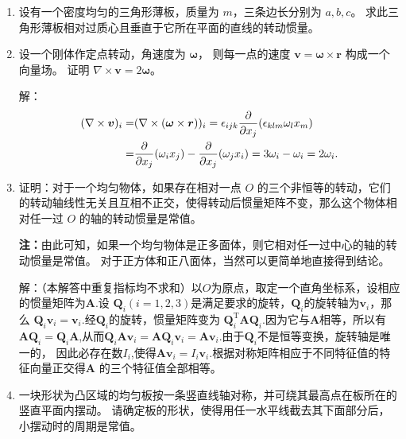 \begin{enumerate}
    \item 设有一个密度均匀的三角形薄板，质量为 $m$，三条边长分别为 $a, b, c$。
    求此三角形薄板相对过质心且垂直于它所在平面的直线的转动惯量。

    \item 设一个刚体作定点转动，角速度为 $\boldsymbol{\omega}$，
    则每一点的速度 $\boldsymbol{v}=\boldsymbol{\omega} \times \boldsymbol{r}$ 构成一个向量场。
    证明 $\nabla \times \boldsymbol{v}=2\boldsymbol{\omega}$。

    解：\begin{align*}
        (\nabla\times \boldsymbol{v})_i=&(\nabla \times (\boldsymbol{\omega}\times\boldsymbol{r}))_i=
        \epsilon_{ijk}\frac{\partial}{\partial x_j}(\epsilon_{klm}\omega_lx_m)\\
        =&\frac{\partial}{\partial x_j}(\omega_ix_j)-\frac{\partial}{\partial x_j}(\omega_jx_i)=3\omega_i-\omega_i=2\omega_i.
    \end{align*}

    \item 证明：对于一个均匀物体，如果存在相对一点 $O$ 的三个非恒等的转动，它们的转动轴线性无关且互相不正交，使得转动后惯量矩阵不变，那么这个物体相对任一过 $O$ 的轴的转动惯量是常值。

    \textbf{注：}由此可知，如果一个均匀物体是正多面体，则它相对任一过中心的轴的转动惯量是常值。
    对于正方体和正八面体，当然可以更简单地直接得到结论。

    解：（本解答中重复指标均不求和）以$O$为原点，取定一个直角坐标系，设相应的惯量矩阵为$\boldsymbol{A}$.设
    $\boldsymbol{Q}_i(i=1,2,3)$是满足要求的旋转，$\boldsymbol{Q}_i$的旋转轴为$\boldsymbol{v}_i$，那么
    $\boldsymbol{Q}_i\boldsymbol{v}_i=\boldsymbol{v}_i$.经$\boldsymbol{Q}_i$的旋转，惯量矩阵变为
    $\boldsymbol{Q}_i^{\text{T}}\boldsymbol{A}\boldsymbol{Q}_i$.因为它与$\boldsymbol{A}$相等，所以有
    $\boldsymbol{A}\boldsymbol{Q}_i=\boldsymbol{Q}_i\boldsymbol{A}$,从而$\boldsymbol{Q}_i\boldsymbol{A}\boldsymbol{v}_i
    =\boldsymbol{A}\boldsymbol{Q}_i\boldsymbol{v}_i=\boldsymbol{A}\boldsymbol{v}_i$.由于$\boldsymbol{Q}_i$不是恒等变换，旋转轴是唯一的，
    因此必存在数$I_i$,使得$\boldsymbol{A}\boldsymbol{v}_i=I_i\boldsymbol{v}_i$.根据对称矩阵相应于不同特征值的特征向量正交得$\boldsymbol{A}$
    的三个特征值全部相等。

    \item 一块形状为凸区域的均匀板按一条竖直线轴对称，并可绕其最高点在板所在的竖直平面内摆动。
    请确定板的形状，使得用任一水平线截去其下面部分后，小摆动时的周期是常值。


\end{enumerate}
